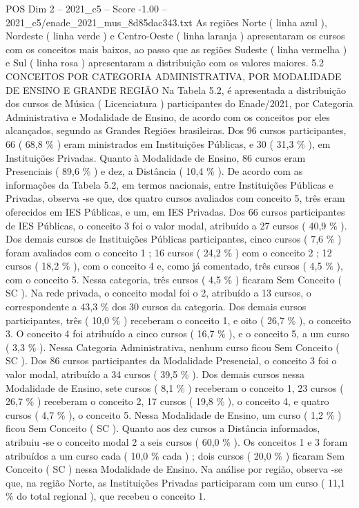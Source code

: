 \begin{textsample}{POS Dim 2 – 2021\_c5 – Score -1.00 – 2021\_c5/enade\_2021\_mus\_8d85dac343.txt}
As regiões Norte ( linha azul ), Nordeste ( linha verde ) e Centro-Oeste ( linha laranja ) apresentaram os cursos com os conceitos mais baixos, ao passo que as regiões Sudeste ( linha vermelha ) e Sul ( linha rosa ) apresentaram a distribuição com os valores maiores. 5.2 CONCEITOS POR CATEGORIA ADMINISTRATIVA, POR MODALIDADE DE ENSINO E GRANDE REGIÃO Na Tabela 5.2, é apresentada a distribuição dos cursos de Música ( Licenciatura ) participantes do Enade/2021, por Categoria Administrativa e Modalidade de Ensino, de acordo com os conceitos por eles alcançados, segundo as Grandes Regiões brasileiras.
Dos 96 cursos participantes, 66 ( 68,8 \% ) eram ministrados em Instituições Públicas, e 30 ( 31,3 \% ), em Instituições Privadas.
Quanto à Modalidade de Ensino, 86 cursos eram Presenciais ( 89,6 \% ) e dez, a Distância ( 10,4 \% ).
De acordo com as informações da Tabela 5.2, em termos nacionais, entre Instituições Públicas e Privadas, observa -se que, dos quatro cursos avaliados com conceito 5, três eram oferecidos em IES Públicas, e um, em IES Privadas.
Dos 66 cursos participantes de IES Públicas, o conceito 3 foi o valor modal, atribuído a 27 cursos ( 40,9 \% ).
Dos demais cursos de Instituições Públicas participantes, cinco cursos ( 7,6 \% ) foram avaliados com o conceito 1 ; 16 cursos ( 24,2 \% ) com o conceito 2 ; 12 cursos ( 18,2 \% ), com o conceito 4 e, como já comentado, três cursos ( 4,5 \% ), com o conceito 5.
Nessa categoria, três cursos ( 4,5 \% ) ficaram Sem Conceito ( SC ).
Na rede privada, o conceito modal foi o 2, atribuído a 13 cursos, o correspondente a 43,3 \% dos 30 cursos da categoria.
Dos demais cursos participantes, três ( 10,0 \% ) receberam o conceito 1, e oito ( 26,7 \% ), o conceito 3.
O conceito 4 foi atribuído a cinco cursos ( 16,7 \% ), e o conceito 5, a um curso ( 3,3 \% ).
Nessa Categoria Administrativa, nenhum curso ficou Sem Conceito ( SC ).
Dos 86 cursos participantes da Modalidade Presencial, o conceito 3 foi o valor modal, atribuído a 34 cursos ( 39,5 \% ).
Dos demais cursos nessa Modalidade de Ensino, sete cursos ( 8,1 \% ) receberam o conceito 1, 23 cursos ( 26,7 \% ) receberam o conceito 2, 17 cursos ( 19,8 \% ), o conceito 4, e quatro cursos ( 4,7 \% ), o conceito 5.
Nessa Modalidade de Ensino, um curso ( 1,2 \% ) ficou Sem Conceito ( SC ).
Quanto aos dez cursos a Distância informados, atribuiu -se o conceito modal 2 a seis cursos ( 60,0 \% ).
Os conceitos 1 e 3 foram atribuídos a um curso cada ( 10,0 \% cada ) ; dois cursos ( 20,0 \% ) ficaram Sem Conceito ( SC ) nessa Modalidade de Ensino.
Na análise por região, observa -se que, na região Norte, as Instituições Privadas participaram com um curso ( 11,1 \% do total regional ), que recebeu o conceito 1.

\end{textsample}

